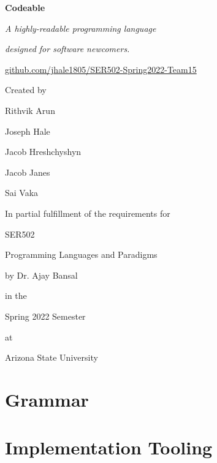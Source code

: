 \documentclass{article}
\begin{document}
    {
        \centering
        
        \textbf{\Huge{Codeable}}
        
        \vspace*{1em}
        \Large{\emph{A highly-readable programming language}}
        
        \Large{\emph{designed for software newcomers.}}
        
        \vspace*{1em}
        \href{https://github.com/jhale1805/SER502-Spring2022-Team15}{github.com/jhale1805/SER502-Spring2022-Team15}

        \vspace*{5em}
        \Large{Created by}
        
        \vspace*{1em}
        \normalsize{Rithvik Arun}
        
        Joseph Hale 
        
        Jacob Hreshchyshyn 
        
        Jacob Janes 
        
        Sai Vaka
        
        \vspace*{5em}
        \Large{In partial fulfillment of the requirements for}
        
        \vspace*{1em}
        \normalsize{SER502}
        
        Programming Languages and Paradigms
        
        by Dr. Ajay Bansal
        
        \vspace*{1em}
        in the 
        
        Spring 2022 Semester
        
        \vspace*{1em}
        at

        Arizona State University

    }
    
    \newpage
    \section{Grammar}
    
    
    \newpage
    \section{Implementation Tooling}
    
\end{document}
